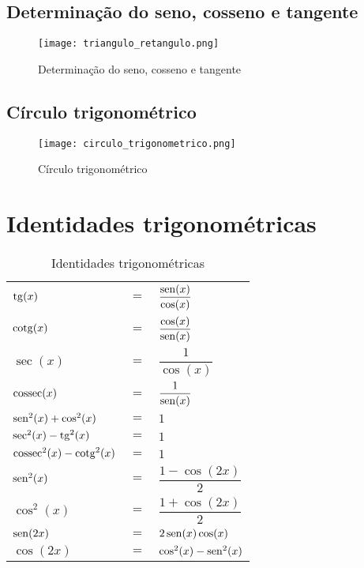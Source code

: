 \subsection{Determinação do seno, cosseno e tangente}
	\begin{figure}[H]
		\centering
		\texttt{[image: triangulo\_retangulo.png]}
		\caption{Determinação do seno, cosseno e tangente}
		\label{triangulo_retangulo}
	\end{figure}
	
\subsection{Círculo trigonométrico}
	\begin{figure}[H]
		\centering
		\texttt{[image: circulo\_trigonometrico.png]}
		\caption{Círculo trigonométrico}
		\label{circulo_trigonometrico}
	\end{figure}
	
\section{Identidades trigonométricas}
	\begin{table}[H]
		\centering
		\begin{tabular}{|lcl|}
			$\operatorname{tg}(x)$                    & $=$ & $\dfrac{\operatorname{sen}(x)}{\cos(x)}$ \\
			$\operatorname{cotg}(x)$                  & $=$ & $\dfrac{\cos(x)}{\operatorname{sen}(x)}$ \\
			$\sec(x)$                   & $=$ & $\dfrac{1}{\cos(x)}$       \\
			$\operatorname{cossec}(x)$                & $=$ & $\dfrac{1}{\operatorname{sen}(x)}$       \\
			$\operatorname{sen}^2(x) + \cos^2(x)$     & $=$ & $1$                        \\
			$\sec^2(x) - \operatorname{tg}^2(x)$      & $=$ & $1$                        \\
			$\operatorname{cossec}^2(x) - \operatorname{cotg}^2(x)$ & $=$ & $1$                        \\
			$\operatorname{sen}^2(x)$                 & $=$ & $\dfrac{1 - \cos(2x)}{2}$  \\
			$\cos^2(x)$                 & $=$ & $\dfrac{1 + \cos(2x)}{2}$  \\
			$\operatorname{sen}(2x)$                  & $=$ & $2\operatorname{sen}(x)\cos(x)$          \\
			$\cos(2x)$                  & $=$ & $\cos^2(x) - \operatorname{sen}^2(x)$
		\end{tabular}
		\caption{Identidades trigonométricas}
		\label{identidades_trigonometricas}
	\end{table}
	
